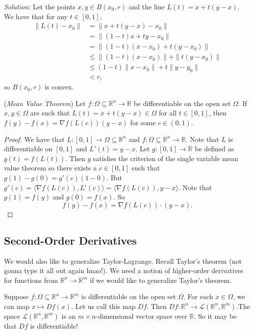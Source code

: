 \documentclass[11pt]{article}
\theoremstyle{definition}
\newcommand{\R}{\mathbb{R}}                      %
\begin{document}
\textit{Solution:} Let the points $x,y\in B(x_0,r)$ and the line $L(t)=x+t(y-x)$. We have that for any $t\in [0,1]$,
$$
\begin{aligned}
    \|L(t)-x_0\|&=\|x+t(y-x)-x_0\|\\
    &=\|(1-t)x + ty -x_0\|\\
    &=\|(1-t)(x-x_0)+t(y-x_0)\|\\
    &\leq \|(1-t)(x-x_0)\| +\|t(y-x_0)\|\\
    &\leq (1-t)\|x-x_0\|+t\|y-y_0\|\\
    &< r,
\end{aligned}
$$
so $B(x_0,r)$ is convex.

\prop (\textit{Mean Value Theorem}) Let $f:\Omega\subseteq \R^n\to \R$ be differentiable on the open set $\Omega$. If $x,y\in \Omega$ are such that $L(t)=x+t(y-x)\in\Omega$ for all $t\in[0,1]$, then $f(y)-f(x)=\nabla f(L(c))(y-x)$ for some $c\in (0,1)$.

\begin{proof}
We have that $L:[0,1]\to\Omega\subseteq\R^n$ and $f:\Omega\subseteq \R^n\to \R$. Note that $L$ is differentiable on $[0,1]$ and $L'(t)=y-x$. Let $g:[0,1]\to \R$ be defined as $g(t)=f(L(t))$. Then $g$ satisfies the criterion of the single variable mean value theorem so there exists a $c\in[0,1]$ such that $g(1)-g(0)=g'(c)(1-0)$. But $g'(c)=\langle \nabla f(L(c)),L'(c)\rangle=\langle \nabla f(L(c)),y-x\rangle$. Note that $g(1)=f(y)$ and $g(0)=f(x)$. So 
$$
f(y)-f(x)=\nabla f(L(c))\cdot (y-x).
$$
\end{proof}

\subsection{Second-Order Derivatives}
We would also like to generalize Taylor-Lagrange. Recall Taylor's theorem (not gonna type it all out again lmao!). We need a notion of higher-order derivatives for functions from $\R^n\to\R^m$ if we would like to generalize Taylor's theorem. 

Suppose $f:\Omega\subseteq\R^n\to\R^m$ is differentiable on the open set $\Omega$. For each $x\in \Omega$, we can map $x\mapsto Df(x)$. Let us call this map $Df$. Then $Df:\R^n\to\mathcal{L}(\R^n,\R^m)$.The space $\mathcal{L}(\R^n,\R^m)$ is an $m\times n$-dimensional vector space over $\R$. So it may be that $Df$ is differentiable!
\end{document}
